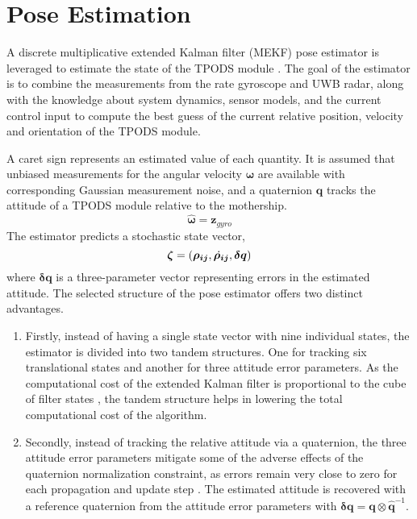 \section{Pose Estimation}
A discrete multiplicative extended Kalman filter (MEKF) pose estimator is leveraged to estimate the state of the TPODS module \cite{TPODS_GNC24}. The goal of the estimator is to combine the measurements from the rate gyroscope and UWB radar, along with the knowledge about system dynamics, sensor models, and the current control input to compute the best guess of the current relative position, velocity and orientation of the TPODS module.

A caret sign represents an estimated value of each quantity. It is assumed that unbiased measurements for the angular velocity $\boldsymbol{\omega}$ are available with corresponding Gaussian measurement noise, and a quaternion $\boldsymbol{q}$ tracks the attitude of a TPODS module relative to the mothership. 
\begin{equation}
\boldsymbol{\hat{\omega}} = \boldsymbol{z}_{gyro}
\end{equation}
The estimator predicts a stochastic state vector,
\begin{equation}
\boldsymbol{\zeta} = (\boldsymbol{\rho_{ij}},\skew{-8}\dot{\boldsymbol{\rho_{ij}}},\boldsymbol{\delta q})
\end{equation}
where $\boldsymbol{\delta q}$ is a three-parameter vector representing errors in the estimated attitude. The selected structure of the pose estimator offers two distinct advantages. 
\begin{enumerate}
    \item Firstly, instead of having a single state vector with nine individual states, the estimator is divided into two tandem structures. One for tracking six translational states and another for three attitude error parameters. As the computational cost of the extended Kalman filter is proportional to the cube of filter states \cite{filter_compute}, the tandem structure helps in lowering the total computational cost of the algorithm.
    \item Secondly, instead of tracking the relative attitude via a quaternion, the three attitude error parameters mitigate some of the adverse effects of the quaternion normalization constraint, as errors remain very close to zero for each propagation and update step \cite{crassidis2011optimal}. The estimated attitude is recovered with a reference quaternion from the attitude error parameters with $\mathbf{\delta q} = \mathbf{q}\otimes\mathbf{\hat{q}}^{-1}$.
\end{enumerate}
